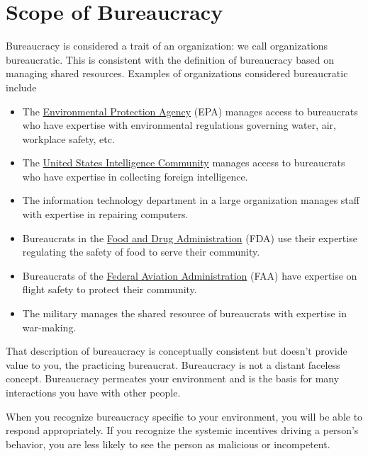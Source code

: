 \section{Scope of Bureaucracy}
Bureaucracy is considered a trait of an organization: we call organizations bureaucratic. This is consistent with the definition of bureaucracy based on managing \glspl{shared resource}. Examples of organizations considered bureaucratic include
  \begin{itemize}
      \item The \href{https://www.epa.gov/}{Environmental Protection Agency} (EPA) manages access to bureaucrats who have expertise with environmental regulations governing water, air, workplace safety, etc.
      \item The \href{https://www.intelligence.gov/}{United States Intelligence Community} manages access to bureaucrats who have expertise in collecting foreign intelligence.
      \item The information technology department in a large organization manages staff with expertise in repairing computers.
      \item Bureaucrats in the \href{https://www.fda.gov/}{Food and Drug Administration} (FDA) use their expertise regulating the safety of food to serve their community.
      \item Bureaucrats of the \href{https://www.faa.gov/}{Federal Aviation Administration} (FAA) have expertise on flight safety to protect their community.
      \item The military manages the shared resource of bureaucrats with expertise in war-making.
  \end{itemize}

That description of bureaucracy is conceptually consistent but doesn't provide value to you, the practicing bureaucrat. Bureaucracy is not a distant faceless concept. Bureaucracy permeates your environment and is the basis for many interactions you have with other people. 

When you recognize bureaucracy specific to your environment, you will be able to respond appropriately. If you recognize the systemic incentives driving a person's behavior, you are less likely to see the person as malicious or incompetent. 